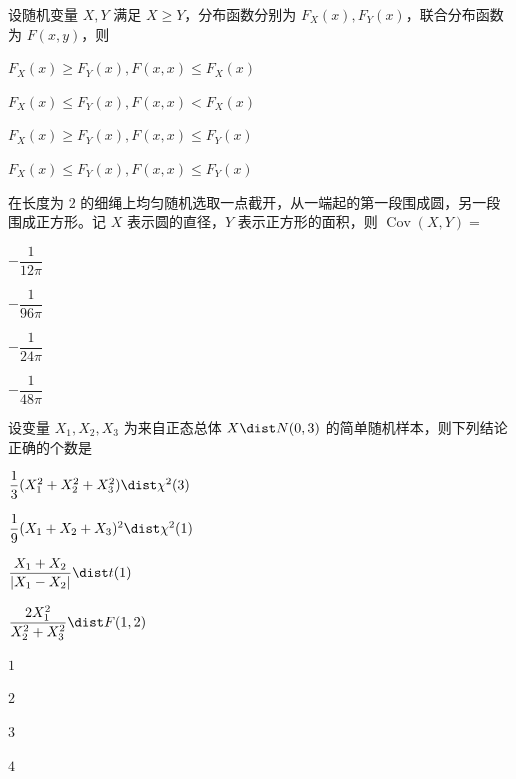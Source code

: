 \begin{question}[index=8]
设随机变量 $X,Y$ 满足 $X\ge Y$，分布函数分别为 $F_X(x),F_Y(x)$，联合分布函数为 $F(x,y)$，则
\begin{choices}[columns=2]
\item $F_X(x)\ge F_Y(x),F(x,x)\le F_X(x)$
\item $F_X(x)\le F_Y(x),F(x,x)<F_X(x)$
\item $F_X(x)\ge F_Y(x),F(x,x)\le F_Y(x)$
\item $F_X(x)\le F_Y(x),F(x,x)\le F_Y(x)$
\end{choices}
\end{question}
\QuestionBreak

\begin{question}[index=9]
在长度为 $2$ 的细绳上均匀随机选取一点截开，从一端起的第一段围成圆，另一段围成正方形。记 $X$ 表示圆的直径，$Y$ 表示正方形的面积，则 $\operatorname{Cov}(X,Y)=$
\begin{choices}[columns=4]
\item $-\dfrac1{12\pi}$
\item $-\dfrac1{96\pi}$
\item $-\dfrac1{24\pi}$
\item $-\dfrac1{48\pi}$
\end{choices}
\end{question}
\QuestionBreak

\begin{question}[index=10]
设变量 $X_1,X_2,X_3$ 为来自正态总体 $X\dist N(0,3)$ 的简单随机样本，则下列结论正确的个数是
\par{}\quad $\dfrac13(X_1^2+X_2^2+X_3^2)\dist\chi^2(3)$
\par{}\quad $\dfrac19(X_1+X_2+X_3)^2\dist\chi^2(1)$
\par{}\quad $\dfrac{X_1+X_2}{|X_1-X_2|}\dist t(1)$
\par{}\quad $\dfrac{2X_1^2}{X_2^2+X_3^2}\dist F(1,2)$
\begin{choices}[columns=4]
\item $1$
\item $2$
\item $3$
\item $4$
\end{choices}
\end{question}
